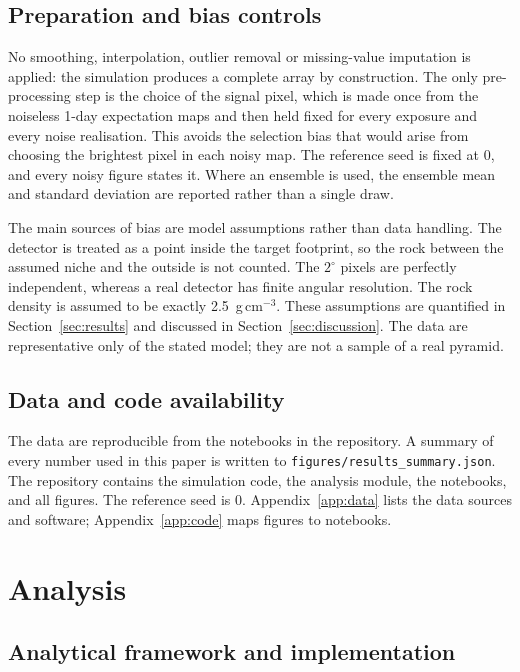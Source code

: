 \documentclass{article}
\begin{document}
\subsection{Preparation and bias controls}

No smoothing, interpolation, outlier removal or missing-value imputation is
applied: the simulation produces a complete array by construction. The only
pre-processing step is the choice of the signal pixel, which is made once from
the noiseless 1-day expectation maps and then held fixed for every exposure and
every noise realisation. This avoids the selection bias that would arise from
choosing the brightest pixel in each noisy map. The reference seed is fixed at
0, and every noisy figure states it. Where an ensemble is used, the ensemble
mean and standard deviation are reported rather than a single draw.

The main sources of bias are model assumptions rather than data handling. The
detector is treated as a point inside the target footprint, so the rock between
the assumed niche and the outside is not counted. The $2^\circ$ pixels are
perfectly independent, whereas a real detector has finite angular resolution.
The rock density is assumed to be exactly 2.5~g\,cm$^{-3}$. These assumptions
are quantified in Section~\ref{sec:results} and discussed in
Section~\ref{sec:discussion}. The data are representative only of the stated
model; they are not a sample of a real pyramid.

\subsection{Data and code availability}

The data are reproducible from the notebooks in the repository. A summary of
every number used in this paper is written to
\texttt{figures/results\_summary.json}. The repository contains the simulation
code, the analysis module, the notebooks, and all figures. The reference seed
is 0. Appendix~\ref{app:data} lists the data sources and software;
Appendix~\ref{app:code} maps figures to notebooks.


\section{Analysis}
\label{sec:analysis}

\subsection{Analytical framework and implementation}
\end{document}

